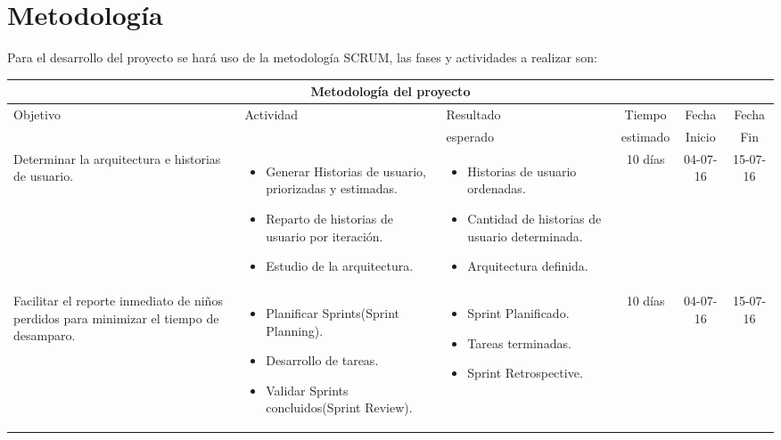 \documentclass[letter,11pt,oneside,spanish]{article}
\begin{document}
\section{Metodología}
Para el desarrollo del proyecto se hará uso de la metodología SCRUM, las fases y actividades a realizar son:

\begin{table}
\centering
\begin{tabular}{|p{3.5cm}|p{3.5cm}|p{3.5cm}|c|c|c|}
	\hline
	\multicolumn{6}{|c|}{Metodología del proyecto} \\ \hline
	Objetivo 	& Actividad 						& 	Resultado  	& Tiempo 	   & Fecha & Fecha   \\
	 				&										& 	esperado		& estimado  & Inicio 	& Fin   \\ \hline
	 Determinar la arquitectura e historias de usuario. & \begin{itemize}[leftmargin=*]
	 																					\item Generar Historias de usuario, priorizadas y estimadas.
																					 	\item Reparto de historias de usuario por iteración.
																					 	\item Estudio de la arquitectura.
																					\end{itemize}  	& \begin{itemize}[leftmargin=*]
	 																					\item Historias de usuario ordenadas.
																					 	\item Cantidad de historias de usuario determinada.
																					 	\item Arquitectura definida.
																					\end{itemize}  	& 10 días & 04-07-16 & 15-07-16										\\ 
	\hline %
	Facilitar el reporte inmediato de niños perdidos para minimizar el tiempo de desamparo. & \begin{itemize}[leftmargin=*]
	 																					\item Planificar Sprints(Sprint Planning).
																					 	\item Desarrollo de tareas.
																					 	\item Validar Sprints concluidos(Sprint Review).
																					\end{itemize}  	& \begin{itemize}[leftmargin=*]
	 																					\item Sprint Planificado.
																					 	\item Tareas terminadas.
																					 	\item Sprint Retrospective.
																					\end{itemize}  	& 10 días & 04-07-16 & 15-07-16										\\ 
	\hline %
\end{tabular}
\end{table}
\end{document}
